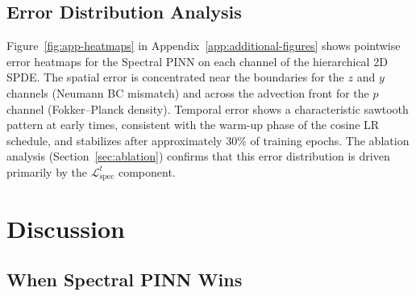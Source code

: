 \documentclass[times,12pt]{elsarticle}
\begin{document}
\subsection{Error Distribution Analysis}

Figure~\ref{fig:app-heatmaps} in Appendix~\ref{app:additional-figures} shows
pointwise error heatmaps for the Spectral PINN on each channel of the
hierarchical 2D SPDE. The spatial error is concentrated near the boundaries
for the $z$ and $y$ channels (Neumann BC mismatch) and across the advection
front for the $p$ channel (Fokker--Planck density). Temporal error shows a
characteristic sawtooth pattern at early times, consistent with the warm-up
phase of the cosine LR schedule, and stabilizes after approximately $30\%$
of training epochs. The ablation analysis (Section~\ref{sec:ablation})
confirms that this error distribution is driven primarily by the
$\mathcal{L}_{\text{spec}}^{t}$ component.


\section{Discussion}
\label{sec:discussion}

\subsection{When Spectral PINN Wins}
\end{document}
